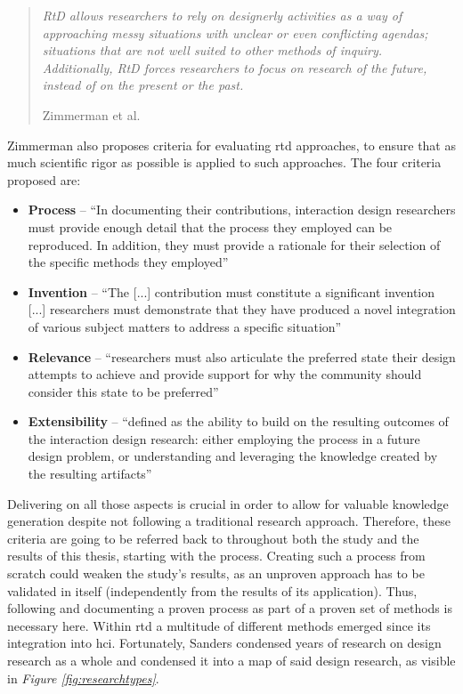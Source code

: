 \begin{quote}
  \textit{RtD allows researchers to rely on designerly activities as a way of approaching messy situations with unclear or even conflicting agendas; situations that are not well suited to other methods of inquiry. Additionally, RtD forces researchers to focus on research of the future, instead of on the present or the past.}

  \footnotesize{Zimmerman et al. \cite[p. 310]{zimmerman2010analysis}}
\end{quote}

Zimmerman also proposes criteria for evaluating \gls{rtd} approaches, to ensure that as much scientific rigor as possible is applied to such approaches. The four criteria proposed are:

\begin{itemize}
  \item{\textbf{Process} -- \enquote{In documenting their contributions, interaction design researchers must provide enough detail that the process they employed can be reproduced. In addition, they must provide a rationale for their selection of the specific methods they employed} \cite[p. 499]{zimmerman2007research}}
  \item{\textbf{Invention} -- \enquote{The [...] contribution must constitute a significant invention [...] researchers must demonstrate that they have produced a novel integration of various subject matters to address a specific situation} \cite[p. 499]{zimmerman2007research}}
  \item{\textbf{Relevance} -- \enquote{researchers must also articulate the preferred state their design attempts to achieve and provide support for why the community should consider this state to be preferred} \cite[p. 499-500]{zimmerman2007research}}
  \item{\textbf{Extensibility} -- \enquote{defined as the ability to build on the resulting outcomes of the interaction design research: either employing the process in a future design problem, or understanding and leveraging the knowledge created by the resulting artifacts} \cite[p. 500]{zimmerman2007research}}
\end{itemize}

Delivering on all those aspects is crucial in order to allow for valuable knowledge generation despite not following a traditional research approach. Therefore, these criteria are going to be referred back to throughout both the study and the results of this thesis, starting with the process. Creating such a process from scratch could weaken the study's results, as an unproven approach has to be validated in itself (independently from the results of its application). Thus, following and documenting a proven process as part of a proven set of methods is necessary here. Within \gls{rtd} a multitude of different methods emerged since its integration into \gls{hci}. Fortunately, Sanders condensed years of research on design research as a whole and condensed it into a map of said design research, as visible in \textit{Figure \ref{fig:researchtypes}}.

